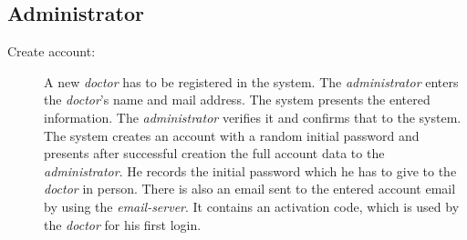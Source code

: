 \documentclass[fontsize=12pt,
               paper=a4,
               twoside=false,
               parskip=half,
               ]{scrartcl}
\begin{document}
\subsection{Administrator}

\begin{description}	
\item[Create account:] A new \emph{doctor} has to be registered in the system. The \emph{administrator} enters the \emph{doctor}'s name and mail address. The system presents the entered information. The \emph{administrator} verifies it and confirms that to the system. The system creates an account with a random initial password and presents after successful creation the full account data to the \emph{administrator}. He records the initial password which he has to give to the \emph{doctor} in person. There is also an email sent to the entered account email by using the \emph{email-server}. It contains an activation code, which is used by the \emph{doctor} for his first login.






\end{description}
\end{document}
